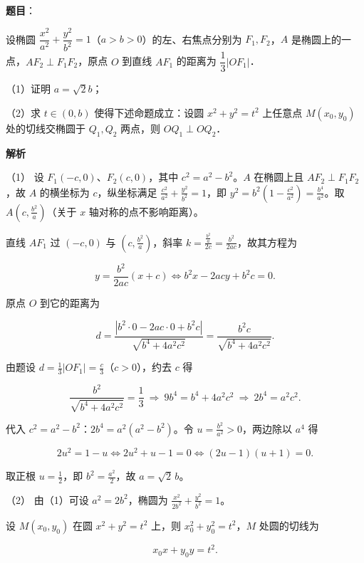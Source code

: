 \begin{answer}

\textbf{题目}：

设椭圆 $\dfrac{x^2}{a^2}+\dfrac{y^2}{b^2}=1$（$a>b>0$）的左、右焦点分别为 $F_1,F_2$，$A$ 是椭圆上的一点，$AF_2\perp F_1F_2$，原点 $O$ 到直线 $AF_1$ 的距离为 $\dfrac13|OF_1|$．

（1）证明 $a=\sqrt2 b$；

（2）求 $t\in(0,b)$ 使得下述命题成立：设圆 $x^2+y^2=t^2$ 上任意点 $M(x_0,y_0)$ 处的切线交椭圆于 $Q_1,Q_2$ 两点，则 $OQ_1\perp OQ_2$．

\textbf{解析}

（1） 设 $F_1(-c,0)$、$F_2(c,0)$，其中 $c^2=a^2-b^2$。$A$ 在椭圆上且 $AF_2\perp F_1F_2$，故 $A$ 的横坐标为 $c$，纵坐标满足 $\frac{c^2}{a^2}+\frac{y^2}{b^2}=1$，即 $y^2=b^2\left(1-\frac{c^2}{a^2}\right)=\frac{b^4}{a^2}$。取 $A\left(c,\frac{b^2}a\right)$（关于 $x$ 轴对称的点不影响距离）。

直线 $AF_1$ 过 $\left(-c,0\right)$ 与 $\left(c,\frac{b^2}a\right)$，斜率 $k=\frac{\frac{b^2}a}{2c}=\frac{b^2}{2ac}$，故其方程为

\nopagebreak[4]
\[y=\frac{b^2}{2ac}\left(x+c\right)\iff b^2x-2acy+b^2c=0 .\]

原点 $O$ 到它的距离为

\nopagebreak[4]
\[d=\frac{\left|b^2\cdot0-2ac\cdot0+b^2c\right|}{\sqrt{b^4+4a^2c^2}}=\frac{b^2c}{\sqrt{b^4+4a^2c^2}} .\]

由题设 $d=\frac13\left|OF_1\right|=\frac c3$（$c>0$），约去 $c$ 得

\nopagebreak[4]
\[\frac{b^2}{\sqrt{b^4+4a^2c^2}}=\frac13\ \Longrightarrow\ 9b^4=b^4+4a^2c^2\ \Longrightarrow\ 2b^4=a^2c^2 .\]

代入 $c^2=a^2-b^2$：$2b^4=a^2\left(a^2-b^2\right)$。令 $u=\frac{b^2}{a^2}>0$，两边除以 $a^4$ 得

\nopagebreak[4]
\[2u^2=1-u\iff2u^2+u-1=0\iff\left(2u-1\right)\left(u+1\right)=0 .\]

取正根 $u=\frac12$，即 $b^2=\frac{a^2}2$，故 $a=\sqrt2\,b$。

（2） 由（1）可设 $a^2=2b^2$，椭圆为 $\frac{x^2}{2b^2}+\frac{y^2}{b^2}=1$。

设 $M(x_0,y_0)$ 在圆 $x^2+y^2=t^2$ 上，则 $x_0^2+y_0^2=t^2$，$M$ 处圆的切线为

\nopagebreak[4]
\[x_0x+y_0y=t^2 .\]


\end{answer}
